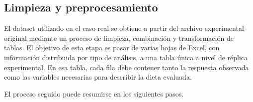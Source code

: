 \subsection{Limpieza y preprocesamiento}
\label{subsec:preprocesamiento_caso_real}

El dataset utilizado en el caso real se obtiene a partir del archivo experimental original mediante un proceso de limpieza, combinación y transformación de tablas. El objetivo de esta etapa es pasar de varias hojas de Excel, con información distribuida por tipo de análisis, a una tabla única a nivel de réplica experimental. En esa tabla, cada fila debe contener tanto la respuesta observada como las variables necesarias para describir la dieta evaluada.

El proceso seguido puede resumirse en los siguientes pasos.

